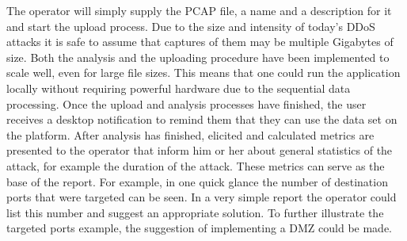 The operator will simply supply the PCAP file, a name and a description for it and start the upload process. Due to the size and intensity of today's DDoS attacks it is safe to assume that captures of them may be multiple Gigabytes of size. Both the analysis and the uploading procedure have been implemented to scale well, even for large file sizes. This means that one could run the application locally without requiring powerful hardware due to the sequential data processing. Once the upload and analysis processes have finished, the user receives a desktop notification to remind them that they can use the data set on the platform.
After analysis has finished, elicited and calculated metrics are presented to the operator that inform him or her about general statistics of the attack, for example the duration of the attack. These metrics can serve as the base of the report. For example, in one quick glance the number of destination ports that were targeted can be seen. In a very simple report the operator could list this number and suggest an appropriate solution. To further illustrate the targeted ports example, the suggestion of implementing a DMZ could be made. 

